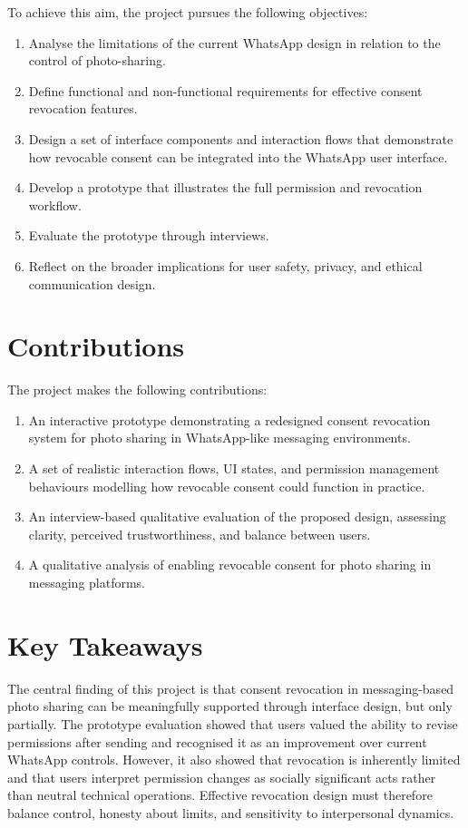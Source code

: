 \documentclass[11pt]{informatics-report}
\begin{document}
\noindent
To achieve this aim, the project pursues the following objectives:
\begin{enumerate}
\item Analyse the limitations of the current WhatsApp design in relation to the control of photo-sharing.
\item Define functional and non-functional requirements for effective consent revocation features.
\item Design a set of interface components and interaction flows that demonstrate how revocable consent can be integrated into the WhatsApp user interface.
\item Develop a prototype that illustrates the full permission and revocation workflow.
\item Evaluate the prototype through interviews.
\item Reflect on the broader implications for user safety, privacy, and ethical communication design.
\end{enumerate}

\section{Contributions}
The project makes the following contributions:
\begin{enumerate}
    \item An interactive prototype demonstrating a redesigned consent revocation system for photo sharing in WhatsApp-like messaging environments.
    \item A set of realistic interaction flows, UI states, and permission management behaviours modelling how revocable consent could function in practice.
    \item An interview-based qualitative evaluation of the proposed design, assessing clarity, perceived trustworthiness, and balance between users.
    \item A qualitative analysis of enabling revocable consent for photo sharing in messaging platforms.
\end{enumerate}

\section{Key Takeaways}
The central finding of this project is that consent revocation in messaging-based photo sharing can be meaningfully supported through interface design, but only partially. The prototype evaluation showed that users valued the ability to revise permissions after sending and recognised it as an improvement over current WhatsApp controls. However, it also showed that revocation is inherently limited and that users interpret permission changes as socially significant acts rather than neutral technical operations. Effective revocation design must therefore balance control, honesty about limits, and sensitivity to interpersonal dynamics.
\end{document}
